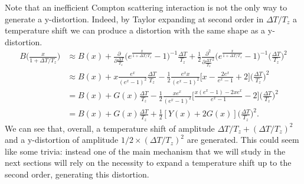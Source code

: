 Note that an inefficient Compton scattering interaction is not the only way to generate a y-distortion. Indeed, by Taylor expanding at second order in $\Delta T/T_z$ a temperature shift we can produce a distortion with the same shape as a y-distortion.
\begin{align}
    \nonumber B\bigg(\frac{x}{1+\Delta T/T_z}\bigg)&\approx B(x)+\frac{\partial}{\partial \frac{\Delta T}{T_z}}\bigg(e^{\frac{x}{1+\Delta T/T_z}}-1\bigg)^{-1}\frac{\Delta T}{T_z}+\frac{1}{2}\frac{\partial^2}{\partial \frac{\Delta T}{T_z}^2}\bigg(e^{\frac{x}{1+\Delta T/T_z}}-1\bigg)^{-1}\bigg(\frac{\Delta T}{T_z}\bigg)^2\\&\nonumber\approx B(x)+x\frac{e^x}{(e^x-1)^2}\frac{\Delta T}{T_z}-\frac{1}{2}\frac{e^xx}{(e^x-1)^2}\bigg[x-\frac{2e^{x}}{e^x-1}+2\bigg]\bigg(\frac{\Delta T}{T_z}\bigg)^2\\ \nonumber&= B(x)+G(x)\frac{\Delta T}{T_z}-\frac{1}{2}\frac{xe^x}{(e^x-1)^2}\bigg[\frac{x(e^x-1)-2xe^x}{e^x-1}-2\bigg]\bigg(\frac{\Delta T}{T_z}\bigg)^2\\&=B(x)+G(x)\frac{\Delta T}{T_z}+\frac{1}{2}[Y(x)+2G(x)]\bigg(\frac{\Delta T}{T_z}\bigg)^2.\label{eq:SD_2ord_temp_shift}
\end{align}
We can see that, overall, a temperature shift of amplitude $\Delta T/T_z+(\Delta T/T_z)^2$ and a y-distortion of amplitude $1/2\times(\Delta T/T_z)^2$ are generated. This could seem like some trivia: instead one of the main mechanism that we will study in the next sections will rely on the necessity to expand a temperature shift up to the second order, generating this distortion.
